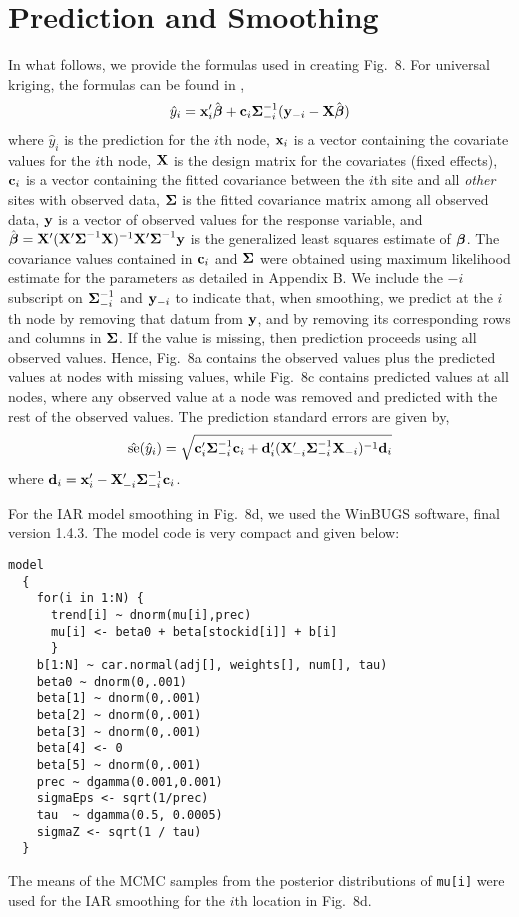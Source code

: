 \documentclass[11pt, titlepage]{article}\usepackage[]{graphicx}\usepackage[]{color}
\begin{document}
\section*{Prediction and Smoothing}

In what follows, we provide the formulas used in creating Fig.~8.  For universal kriging, the formulas can be found in \citet[][p. 148]{Cres:Wikl:stat:2011},
\[
				\hat{y}_i = \mathbf{x}_i^{\prime}\hat{{\boldsymbol{\beta}}} + \mathbf{c}_i\mbox{\boldmath $\Sigma$}^{-1}_{-i}(\mathbf{y}_{-i} - \mathbf{X}\hat{{\boldsymbol{\beta}}})
\]
where $\hat{y}_i$ is the prediction for the $i$th node, $\mathbf{x}_i$ is a vector containing the covariate values for the $i$th node, $\mathbf{X}$ is the design matrix for the covariates (fixed effects), $\mathbf{c}_i$ is a vector containing the fitted covariance between the $i$th site and all \emph{other} sites with observed data, $\mbox{\boldmath $\Sigma$}$ is the fitted covariance matrix among all observed data, $\mathbf{y}$ is a vector of observed values for the response variable, and $\hat{{\boldsymbol{\beta}}} = \mathbf{X}^{\prime}(\mathbf{X}^{\prime}\mbox{\boldmath $\Sigma$}^{-1}\mathbf{X})^{-1}\mathbf{X}^{\prime}\mbox{\boldmath $\Sigma$}^{-1}\mathbf{y}$ is the generalized least squares estimate of ${\boldsymbol{\beta}}$.  The covariance values contained in $\mathbf{c}_i$ and $\mbox{\boldmath $\Sigma$}$ were obtained using maximum likelihood estimate for the parameters as detailed in Appendix B.  We include the $-i$ subscript on $\mbox{\boldmath $\Sigma$}^{-1}_{-i}$ and $\mathbf{y}_{-i}$ to indicate that, when smoothing, we predict at the $i$th node by removing that datum from $\mathbf{y}$, and by removing its corresponding rows and columns in $\mbox{\boldmath $\Sigma$}$.  If the value is missing, then prediction proceeds using all observed values.  Hence, Fig.~8a contains the observed values plus the predicted values at nodes with missing values, while Fig.~8c contains predicted values at all nodes, where any observed value at a node was removed and predicted with the rest of the observed values.  The prediction standard errors are given by,
\[
	\hat{\textrm{se}}(\hat{y}_i) = \sqrt{\mathbf{c}_i^{\prime}\mbox{\boldmath $\Sigma$}^{-1}_{-i}\mathbf{c}_i + 
	  \mathbf{d}_i^{\prime}(\mathbf{X}_{-i}^{\prime}\mbox{\boldmath $\Sigma$}^{-1}_{-i}\mathbf{X}_{-i})^{-1} \mathbf{d}_i}
\]
where $\mathbf{d}_i = \mathbf{x}_i^{\prime} - \mathbf{X}_{-i}^{\prime}\mbox{\boldmath $\Sigma$}^{-1}_{-i}\mathbf{c}_i$.

For the IAR model smoothing in Fig.~8d, we used the WinBUGS \citep{Lunn:Thom:Best:Spie:winb:2000} software, final version 1.4.3.  The model code is very compact and given below:
\begin{Verbatim}[baselinestretch=0.75]
model
  {
    for(i in 1:N) {
      trend[i] ~ dnorm(mu[i],prec)
      mu[i] <- beta0 + beta[stockid[i]] + b[i]
	  }
    b[1:N] ~ car.normal(adj[], weights[], num[], tau)
    beta0 ~ dnorm(0,.001)
    beta[1] ~ dnorm(0,.001)
    beta[2] ~ dnorm(0,.001)
    beta[3] ~ dnorm(0,.001)
    beta[4] <- 0
    beta[5] ~ dnorm(0,.001)
    prec ~ dgamma(0.001,0.001)
    sigmaEps <- sqrt(1/prec)
    tau  ~ dgamma(0.5, 0.0005) 
    sigmaZ <- sqrt(1 / tau)		
  }
\end{Verbatim}
The means of the MCMC samples from the posterior distributions of \texttt{mu[i]} were used for the IAR smoothing for the $i$th location in Fig.~8d.
\end{document}
